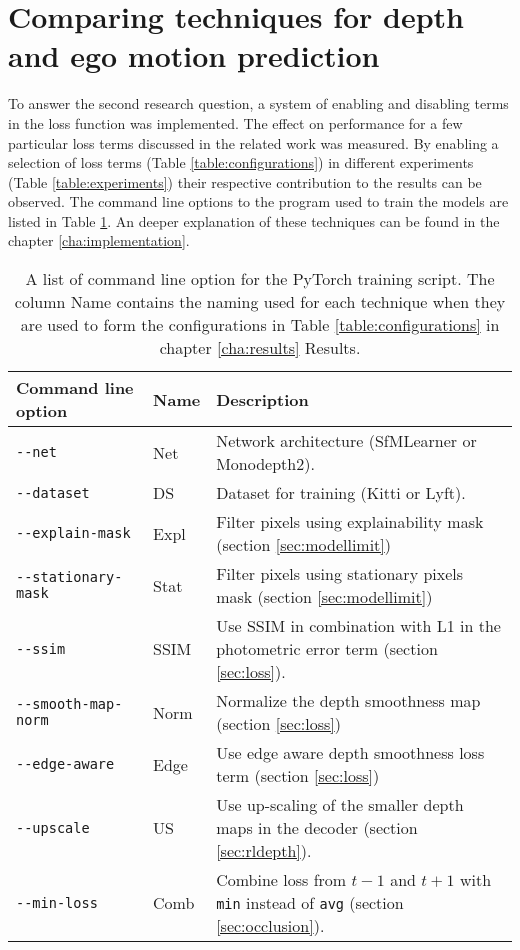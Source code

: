 
\section{Comparing techniques for depth and ego motion prediction}

To answer the second research question, a system of enabling and disabling terms in the loss function was implemented. The effect on performance for a few particular loss terms discussed in the related work was measured. By enabling a selection of loss terms (Table \ref{table:configurations}) in different experiments (Table \ref{table:experiments})  their respective contribution to the results can be observed. The command line options to the program used to train the models are listed in Table \ref{table:cli}. An deeper explanation of these techniques can be found in the chapter \ref{cha:implementation}.

\begin{table}[H]
	\centering
	\begin{tabular}{ |l|l|p{65mm}| }
		\hline
		Command line option & Name & Description \\
		\hline
		\texttt{-{}-net} & Net & Network architecture (SfMLearner or Monodepth2). \\
		\hline
		\texttt{-{}-dataset} & DS & Dataset for training (Kitti or Lyft). \\
		\hline
		\texttt{-{}-explain-mask} & Expl & Filter pixels using explainability mask (section \ref{sec:modellimit}) \\
		\hline
		\texttt{-{}-stationary-mask} & Stat & Filter pixels using stationary pixels mask (section \ref{sec:modellimit}) \\
		\hline
		\texttt{-{}-ssim} & SSIM & Use SSIM in combination with L1 in the photometric error term (section \ref{sec:loss}). \\
		\hline
		\texttt{-{}-smooth-map-norm} & Norm & Normalize the depth smoothness map (section \ref{sec:loss}) \\
		\hline
		\texttt{-{}-edge-aware} & Edge & Use edge aware depth smoothness loss term (section \ref{sec:loss}) \\
		\hline
		\texttt{-{}-upscale} & US & Use up-scaling of the smaller depth maps in the decoder (section \ref{sec:rldepth}). \\
		\hline
		\texttt{-{}-min-loss} & Comb & Combine loss from $t-1$ and $t+1$ with \texttt{min} instead of \texttt{avg} (section \ref{sec:occlusion}). \\
		\hline
	\end{tabular}
	\caption{A list of command line option for the PyTorch training script. The column Name contains the naming used for each technique when they are used to form the configurations in Table \ref{table:configurations} in chapter \ref{cha:results} Results.}
	\label{table:cli}
\end{table}
